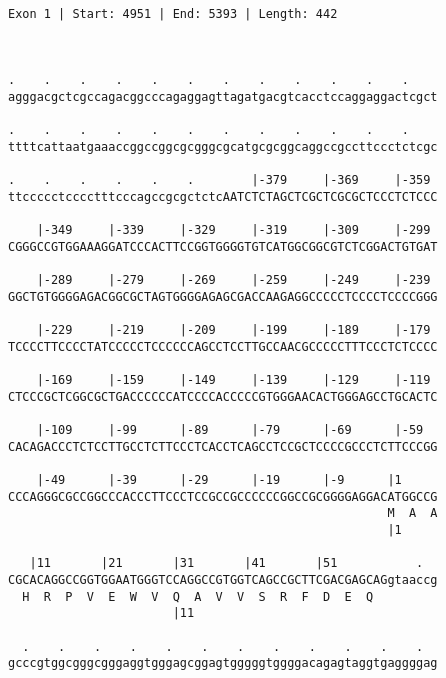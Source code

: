 \documentclass{article}
\begin{document}
 \begin{Verbatim}
 
Exon 1 | Start: 4951 | End: 5393 | Length: 442



.    .    .    .    .    .    .    .    .    .    .    .    
agggacgctcgccagacggcccagaggagttagatgacgtcacctccaggaggactcgct
                                                            
.    .    .    .    .    .    .    .    .    .    .    .    
ttttcattaatgaaaccggccggcgcgggcgcatgcgcggcaggccgccttccctctcgc
                                                            
.    .    .    .    .    .        |-379     |-369     |-359 
ttccccctcccctttcccagccgcgctctcAATCTCTAGCTCGCTCGCGCTCCCTCTCCC
                                                            
    |-349     |-339     |-329     |-319     |-309     |-299 
CGGGCCGTGGAAAGGATCCCACTTCCGGTGGGGTGTCATGGCGGCGTCTCGGACTGTGAT
                                                            
    |-289     |-279     |-269     |-259     |-249     |-239 
GGCTGTGGGGAGACGGCGCTAGTGGGGAGAGCGACCAAGAGGCCCCCTCCCCTCCCCGGG
                                                            
    |-229     |-219     |-209     |-199     |-189     |-179 
TCCCCTTCCCCTATCCCCCTCCCCCCAGCCTCCTTGCCAACGCCCCCTTTCCCTCTCCCC
                                                            
    |-169     |-159     |-149     |-139     |-129     |-119 
CTCCCGCTCGGCGCTGACCCCCCATCCCCACCCCCGTGGGAACACTGGGAGCCTGCACTC
                                                            
    |-109     |-99      |-89      |-79      |-69      |-59  
CACAGACCCTCTCCTTGCCTCTTCCCTCACCTCAGCCTCCGCTCCCCGCCCTCTTCCCGG
                                                            
    |-49      |-39      |-29      |-19      |-9      |1     
CCCAGGGCGCCGGCCCACCCTTCCCTCCGCCGCCCCCCGGCCGCGGGGAGGACATGGCCG
                                                     M  A  A
                                                     |1     
  
   |11       |21       |31       |41       |51           .  
CGCACAGGCCGGTGGAATGGGTCCAGGCCGTGGTCAGCCGCTTCGACGAGCAGgtaaccg
  H  R  P  V  E  W  V  Q  A  V  V  S  R  F  D  E  Q         
                       |11                                  
  
  .    .    .    .    .    .    .    .    .    .    .    .  
gcccgtggcgggcgggaggtgggagcggagtgggggtggggacagagtaggtgaggggag
                                                            

\end{Verbatim}
\end{document}
